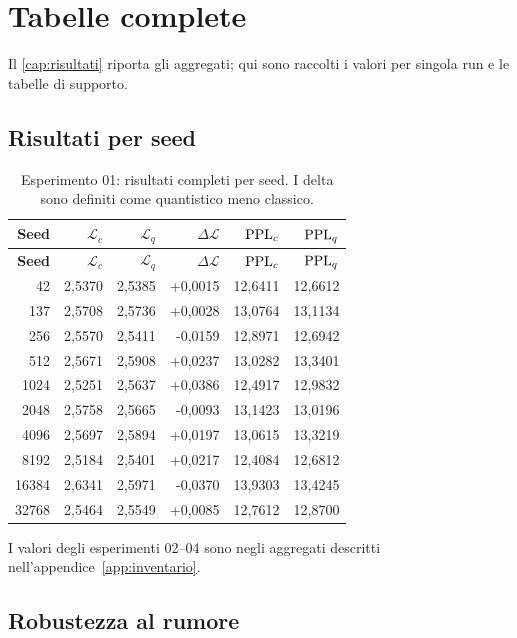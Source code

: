 \chapter{Tabelle complete}
\label{app:tabelle}

Il \cref{cap:risultati} riporta gli aggregati; qui sono raccolti i valori per
singola run e le tabelle di supporto.

\section{Risultati per seed}

\begin{longtable}{@{}r r r r r r@{}}
\caption{Esperimento 01: risultati completi per seed. I delta sono definiti
come quantistico meno classico.}\label{tab:seed-01}\\
\toprule
\textbf{Seed} & $\mathcal{L}_c$ & $\mathcal{L}_q$ & $\Delta\mathcal{L}$ & $\mathrm{PPL}_c$ & $\mathrm{PPL}_q$ \\
\midrule
\endfirsthead
\toprule
\textbf{Seed} & $\mathcal{L}_c$ & $\mathcal{L}_q$ & $\Delta\mathcal{L}$ & $\mathrm{PPL}_c$ & $\mathrm{PPL}_q$ \\
\midrule
\endhead
42    & 2,5370 & 2,5385 & +0,0015 & 12,6411 & 12,6612 \\
137   & 2,5708 & 2,5736 & +0,0028 & 13,0764 & 13,1134 \\
256   & 2,5570 & 2,5411 & -0,0159 & 12,8971 & 12,6942 \\
512   & 2,5671 & 2,5908 & +0,0237 & 13,0282 & 13,3401 \\
1024  & 2,5251 & 2,5637 & +0,0386 & 12,4917 & 12,9832 \\
2048  & 2,5758 & 2,5665 & -0,0093 & 13,1423 & 13,0196 \\
4096  & 2,5697 & 2,5894 & +0,0197 & 13,0615 & 13,3219 \\
8192  & 2,5184 & 2,5401 & +0,0217 & 12,4084 & 12,6812 \\
16384 & 2,6341 & 2,5971 & -0,0370 & 13,9303 & 13,4245 \\
32768 & 2,5464 & 2,5549 & +0,0085 & 12,7612 & 12,8700 \\
\bottomrule
\end{longtable}

I valori degli esperimenti 02--04 sono negli aggregati descritti
nell'appendice~\ref{app:inventario}.

\section{Robustezza al rumore}

